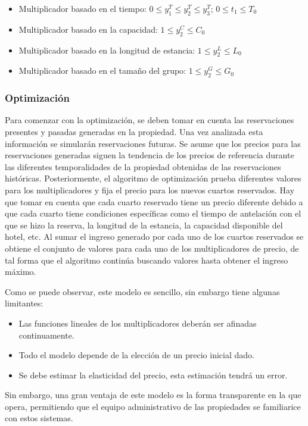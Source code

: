 {{{\begin{itemize}
  \item Multiplicador basado en el tiempo: $0 \leq y_1^T \leq y_2^T \leq y_3^T$; $0 \leq t_1 \leq T_0$
  \item Multiplicador basado en la capacidad: $1 \leq y_2^C \leq C_0$
  \item Multiplicador basado en la longitud de estancia: $1 \leq y_2^L \leq L_0$
  \item Multiplicador basado en el tamaño del grupo: $1 \leq y_2^G \leq G_0$
\end{itemize}

\subsubsection*{Optimización}

Para comenzar con la optimización, se deben tomar en cuenta las reservaciones presentes y pasadas generadas en la propiedad. Una vez analizada esta información se simularán reservaciones futuras. Se asume que los precios para las reservaciones generadas siguen la tendencia de los precios de referencia durante las diferentes temporalidades de la propiedad obtenidas de las reservaciones históricas. Posteriormente, el algoritmo de optimización prueba diferentes valores para los multiplicadores y fija el precio para los nuevos cuartos reservados. Hay que tomar en cuenta que cada cuarto reservado tiene un precio diferente debido a que cada cuarto tiene condiciones específicas como el tiempo de antelación con el que se hizo la reserva, la longitud de la estancia, la capacidad disponible del hotel, etc. Al sumar el ingreso generado por cada uno de los cuartos reservados se obtiene el conjunto de valores para cada uno de los multiplicadores de precio, de tal forma que el algoritmo continúa buscando valores hasta obtener el ingreso máximo.

Como se puede observar, este modelo es sencillo, sin embargo tiene algunas limitantes:
\begin{itemize}
  \item Las funciones lineales de los multiplicadores deberán ser afinadas continuamente.
  \item Todo el modelo depende de la elección de un precio inicial dado.
  \item Se debe estimar la elasticidad del precio, esta estimación tendrá un error.
\end{itemize}

Sin embargo, una gran ventaja de este modelo es la forma transparente en la que opera, permitiendo que el equipo administrativo de las propiedades se familiarice con estos sistemas.

}}}
